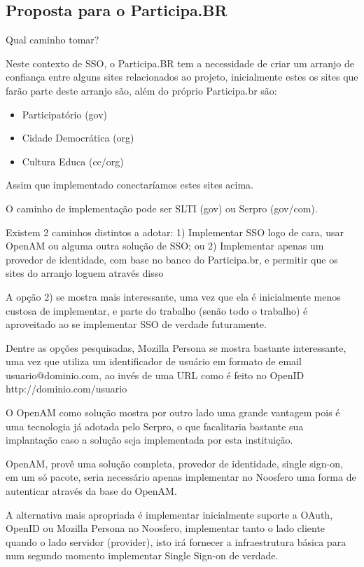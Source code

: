\documentclass[11pt]{article}
\begin{document}
\subsection{Proposta para o Participa.BR}

Qual caminho tomar?

Neste contexto de SSO, o Participa.BR tem a necessidade de criar um
arranjo de confiança entre alguns sites relacionados ao projeto, inicialmente
estes os sites que farão parte deste arranjo são, além do próprio Participa.br
são:

\begin{itemize}
  \item{Participatório (gov)}
  \item{Cidade Democrática (org)}
  \item{Cultura Educa (cc/org)}
\end{itemize}

Assim que implementado conectaríamos estes sites acima.

O caminho de implementação pode ser SLTI (gov) ou Serpro (gov/com).

Existem 2 caminhos distintos a adotar:
1) Implementar SSO logo de cara, usar OpenAM ou alguma outra solução de SSO; ou
2) Implementar apenas um provedor de identidade, com base no banco do
Participa.br, e permitir que os sites do arranjo loguem através disso

A opção 2) se mostra mais interessante, uma vez que ela é inicialmente menos
custosa de implementar, e parte do trabalho (senão todo o trabalho) é
aproveitado ao se implementar SSO de verdade futuramente.

Dentre as opções pesquisadas, Mozilla Persona se mostra bastante interessante,
uma vez que utiliza um identificador de usuário em formato de email
usuario@dominio.com, ao invés de uma URL como é feito no OpenID
http://dominio.com/usuario

O OpenAM como solução mostra por outro lado uma grande vantagem pois é uma
tecnologia já adotada pelo Serpro, o que facalitaria bastante sua implantação
caso a solução seja implementada por esta instituição.

OpenAM, provê uma solução completa, provedor de identidade, single sign-on, em
um só pacote, seria necessário apenas implementar no Noosfero uma forma de
autenticar através da base do OpenAM.

A alternativa mais apropriada é implementar inicialmente suporte a OAuth,
OpenID ou Mozilla Persona no Noosfero, implementar tanto o lado cliente quando
o lado servidor (provider), isto irá fornecer a infraestrutura básica para num
segundo momento implementar Single Sign-on de verdade.
\end{document}
